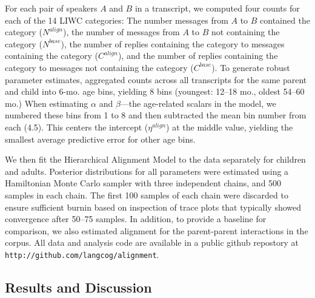 \documentclass[10pt,letterpaper]{article}
\begin{document}
For each pair of speakers $A$ and $B$  in a transcript, we computed four counts for each of the 14 LIWC categories: The number messages from $A$ to $B$ contained the category ($N^{align}$), the number of messages from $A$ to $B$ not containing the category ($N^{base}$), the number of replies containing the category to messages containing the category ($C^{align}$), and the number of replies containing the category to messages not containing the category ($C^{base}$). To generate robust parameter estimates, aggregated counts across all transcripts for the same parent and child into 6-mo. age bins, yielding 8 bins (youngest: 12--18 mo., oldest 54--60 mo.) When estimating $\alpha$ and $\beta$---the age-related scalars in the model, we numbered these bins from 1 to 8 and then subtracted the mean bin number from each (4.5). This centers the intercept ($\eta^{align}$) at the middle value, yielding the smallest average predictive error for other age bins.


We then fit the Hierarchical Alignment Model to the data separately for children and adults. Posterior distributions for all parameters were estimated using a Hamiltonian Monte Carlo sampler \cite{carpenter2016} with three independent chains, and 500 samples in each chain. The first 100 samples of each chain were discarded to ensure sufficient burnin based on inspection of trace plots that typically showed convergence after 50--75 samples. In addition, to provide a baseline for comparison, we also estimated alignment for the parent-parent interactions in the corpus. All data and analysis code are available in a public github repostory at {\small\tt http://github.com/langcog/alignment}.

\subsection{Results and Discussion}
\end{document}
